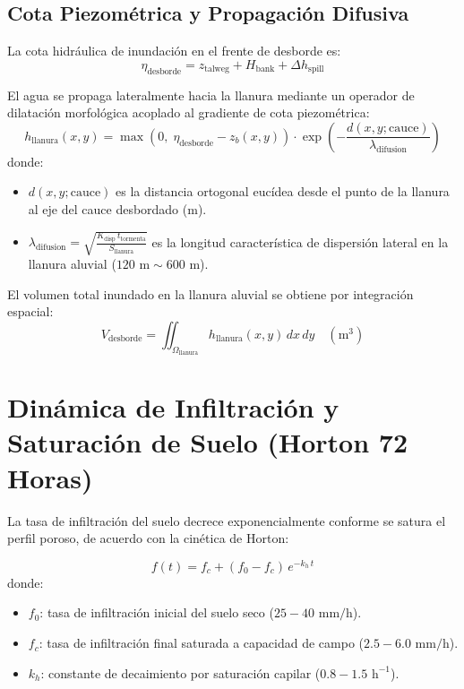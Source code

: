 \documentclass[11pt,a4paper]{article}
\begin{document}
\subsection{Cota Piezométrica y Propagación Difusiva}

La cota hidráulica de inundación en el frente de desborde es:
\begin{equation}
  \eta_{\text{desborde}} = z_{\text{talweg}} + H_{\text{bank}} + \Delta h_{\text{spill}}
\end{equation}

El agua se propaga lateralmente hacia la llanura mediante un operador de dilatación morfológica acoplado al gradiente de cota piezométrica:
\begin{equation}
  h_{\text{llanura}}(x,y) = \max\left(0, \; \eta_{\text{desborde}} - z_b(x,y)\right) \cdot \exp\left( -\frac{d(x,y;\text{cauce})}{\lambda_{\text{difusion}}} \right)
\end{equation}
donde:
\begin{itemize}
  \item $d(x,y;\text{cauce})$ es la distancia ortogonal eucídea desde el punto de la llanura al eje del cauce desbordado (m).
  \item $\lambda_{\text{difusion}} = \sqrt{\frac{K_{\text{disp}} \, t_{\text{tormenta}}}{S_{\text{llanura}}}}$ es la longitud característica de dispersión lateral en la llanura aluvial ($120\text{ m} \sim 600\text{ m}$).
\end{itemize}

El volumen total inundado en la llanura aluvial se obtiene por integración espacial:
\begin{equation}
  V_{\text{desborde}} = \iint_{\Omega_{\text{llanura}}} h_{\text{llanura}}(x,y) \, dx\,dy \quad (\text{m}^3)
\end{equation}

\section{Dinámica de Infiltración y Saturación de Suelo (Horton 72 Horas)}

La tasa de infiltración del suelo decrece exponencialmente conforme se satura el perfil poroso, de acuerdo con la cinética de Horton:

\begin{equation}
  f(t) = f_c + (f_0 - f_c) \, e^{-k_h \, t}
\end{equation}
donde:
\begin{itemize}
  \item $f_0$: tasa de infiltración inicial del suelo seco ($25 - 40\text{ mm/h}$).
  \item $f_c$: tasa de infiltración final saturada a capacidad de campo ($2.5 - 6.0\text{ mm/h}$).
  \item $k_h$: constante de decaimiento por saturación capilar ($0.8 - 1.5\text{ h}^{-1}$).
\end{itemize}
\end{document}

